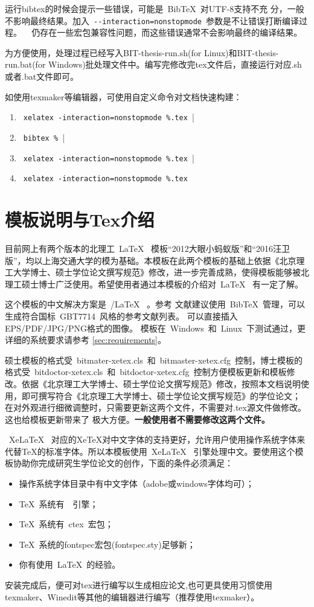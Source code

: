 运行bibtex的时候会提示一些错误，可能是~{{\sc Bib}\TeX}~对UTF-8支持不充
分，一般不影响最终结果。加入~\verb|--interaction=nonstopmode|~参数是不让错误打断编译过程。
\XeTeX~ 仍存在一些宏包兼容性问题，而这些错误通常不会影响最终的编译结果。

为方便使用，处理过程已经写入BIT-thesis-run.sh(for Linux)和BIT-thesis-run.bat(for Windows)批处理文件中。编写完修改完tex文件后，直接运行对应.sh或者.bat文件即可。

如使用texmaker等编辑器，可使用自定义命令对文档快速构建：

{\color{blue}
\begin{enumerate}
\item[] ~\verb|xelatex -interaction=nonstopmode %.tex ||
\item[] ~\verb|bibtex % || 
\item[] ~\verb|xelatex -interaction=nonstopmode %.tex ||
\item[] ~\verb|xelatex -interaction=nonstopmode %.tex|
\end{enumerate}}


\section{模板说明与Tex介绍}
\label{sec:features}
 
目前网上有两个版本的北理工~\LaTeX~ 模板“2012大眼小蚂蚁版”和“2016汪卫版”，均以上海交通大学的模为基础。本模板在此两个模板的基础上依据《北京理工大学博士、硕士学位论文撰写规范》修改，进一步完善成熟，使得模板能够被北理工硕士博士广泛使用。希望使用者通过本模板的介绍对~\LaTeX~ 有一定了解。

这个模板的中文解决方案是~\XeTeX/\LaTeX~ 。参考
文献建议使用~BibTeX~管理，可以生成符合国标~GBT7714~风格的参考文献列表。
可以直接插入EPS/PDF/JPG/PNG格式的图像。
模板在~Windows~和~Linux~下测试通过，更详细的系统要求请参考
\ref{sec:requirements}。

硕士模板的格式受~bitmater-xetex.cls~和~bitmaster-xetex.cfg~控制，博士模板的格式受~bitdoctor-xetex.cls~和~bitdoctor-xetex.cfg~控制方便模板更新和模板修改。依据《北京理工大学博士、硕士学位论文撰写规范》修改，按照本文档说明使用，即可撰写符合《北京理工大学博士、硕士学位论文撰写规范》的学位论文；
在对外观进行细微调整时，只需要更新这两个文件，不需要对.tex源文件做修改。这也给模板更新带来了
极大方便。\textbf{一般使用者不需要修改这两个文件。}
 
~XeLaTeX~ 对应的XeTeX对中文字体的支持更好，允许用户使用操作系统字体来代替TeX的标准字体。所以本模板使用~XeLaTeX~ 引擎处理中文。要使用这个模板协助你完成研究生学位论文的创作，下面的条件必须满足：

\begin{itemize}
\item  操作系统字体目录中有中文字体（adobe或windows字体均可）；
\item  \TeX~系统有~\XeTeX~引擎；
\item  \TeX~系统有~ctex~宏包；
\item  \TeX~系统的fontspec宏包(fontspec.sty)足够新；
\item  你有使用~\LaTeX~的经验。
\end{itemize}

安装完成后，便可对tex进行编写以生成相应论文,也可更具使用习惯使用texmaker、Winedit等其他的编辑器进行编写（推荐使用texmaker）。



